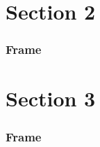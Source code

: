 \documentclass[serif]{beamer}
\begin{document}
\section{Section 2}
\begin{frame}
    \frametitle{Frame}
\end{frame}

\section{Section 3}
\begin{frame}
    \frametitle{Frame}
\end{frame}
\end{document}
